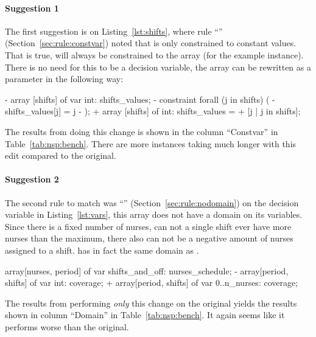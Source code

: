 \documentclass[a4paper,12pt]{article}
\newcommand{\ruleref}[1]{``\nameref{sec:rule:#1}'' (Section~\ref{sec:rule:#1})}
\begin{document}
\paragraph{Suggestion 1}
\begin{sloppypar}
The first suggestion is on Listing~\ref{lst:shifts}, where rule \ruleref{constvar} noted
that  is only constrained to constant values. That is true,
 will always be constrained to the array \mi{[1,2,3]} (for the example instance).
There is no need for this to be a decision variable, the array can be rewritten as a parameter in the following way:
\end{sloppypar}
\begin{mznnobreak}[style=diff]
- array [shifts] of var int: shifts_values;
- constraint forall (j in shifts) (
-   shifts_values[j] = j
- );
+ array [shifts] of int: shifts_values =
+   [j | j in shifts];
\end{mznnobreak}
The results from doing this change is shown in the column ``Constvar'' in
Table~\ref{tab:nsp:bench}. There are more instances taking much longer with this edit
compared to the original.

\paragraph{Suggestion 2}
The second rule to match was \ruleref{nodomain} on the decision variable  in
Listing~\ref{lst:vars}, this array does not have a domain on its variables. Since there is
a fixed number of nurses, can not a single shift ever have more nurses than the maximum, there also
can not be a negative amount of nurses assigned to a shift.  has in fact the
same domain as .
\begin{mznnobreak}[style=diff]
array[nurses, period] of var shifts_and_off: nurses_schedule;
- array[period, shifts] of var int: coverage;
+ array[period, shifts] of var 0..n_nurses: coverage;
\end{mznnobreak}
The results from performing \emph{only} this change on the original yields the results
shown in column ``Domain'' in Table~\ref{tab:nsp:bench}. It again seems like it performs
worse than the original.
\end{document}
